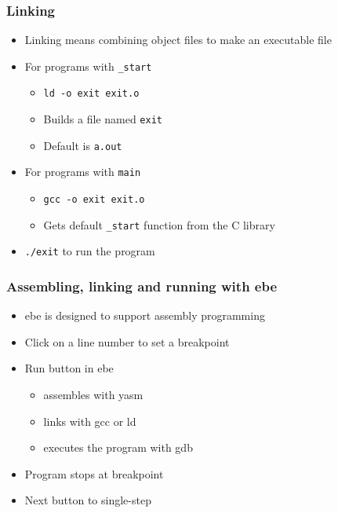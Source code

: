 \documentclass{beamer}
\begin{document}
\begin{frame}
    \frametitle{Linking}
    \begin{itemize}
        \item Linking means combining object files to make an executable file
        \item For programs with {\tt \_start}
        \begin{itemize}
            \item {\tt ld -o exit exit.o}
            \item Builds a file named {\tt exit}
            \item Default is {\tt a.out}
        \end{itemize}
        \item For programs with {\tt main}
        \begin{itemize}
            \item {\tt gcc -o exit exit.o}
            \item Gets default {\tt \_start} function from the C library
        \end{itemize}
        \item {\tt ./exit} to run the program
    \end{itemize}
\end{frame}


\begin{frame}
    \frametitle{Assembling, linking and running with ebe}
    \begin{itemize}
        \item ebe is designed to support assembly programming
        \item Click on a line number to set a breakpoint
        \item Run button in ebe
        \begin{itemize}
            \item assembles with yasm
            \item links with gcc or ld
            \item executes the program with gdb
        \end{itemize}
        \item Program stops at breakpoint
        \item Next button to single-step
    \end{itemize}
\end{frame}
\end{document}
